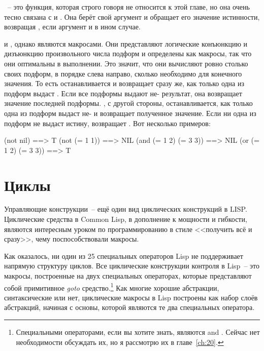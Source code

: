 ~-- это функция, которая строго говоря не относится к этой главе, но она очень
тесно связана с  и . Она берёт свой аргумент и обращает его значение
истинности, возвращая , если аргумент  и  в ином случае.

 и , однако являются макросами. Они представляют логические конъюнкцию
и дизъюнкцию произвольного числа подформ и определены как макросы, так что они оптимальны
в выполнении. Это значит, что они вычисляют ровно столько своих подформ, в порядке слева
направо, сколько необходимо для конечного значения. То есть  останавливается и
возвращает  сразу же, как только одна из подформ выдаст . Если все
подформы выдают не- результат, она возвращает значение последней
подформы. , с другой стороны, останавливается, как только одна из подформ выдаст
не- и возвращает полученное значение. Если ни одна из подформ не выдаст истину,
 возвращает . Вот несколько примеров:

\begin{myverb}
(not nil)             ==> T
(not (= 1 1))         ==> NIL
(and (= 1 2) (= 3 3)) ==> NIL
(or (= 1 2) (= 3 3))  ==> T
\end{myverb}

\section{Циклы}

Управляющие конструкции~-- ещё один вид циклических конструкций в LISP.  Циклические средства в Common Lisp, в дополнение к
мощности и гибкости, являются интересным уроком по программированию в стиле <<получить всё
и сразу>>, чему поспособствовали макросы.

Как оказалось, ни один из 25 специальных операторов Lisp не поддерживает напрямую
структуру циклов. Все циклические конструкции контроля в Lisp~-- это макросы, построенные
на двух специальных операторах, которые представляют собой примитивное \textit{goto}
средство.\footnote{Специальными операторами, если вы хотите знать, являются 
  and . Сейчас нет необходимости обсуждать их, но я рассмотрю их в главе~\ref{ch:20}.} Как
многие хорошие абстракции, синтаксические или нет, циклические макросы в Lisp построены
как набор слоёв абстракций, начиная с основы, которой являются те два специальных
оператора.

